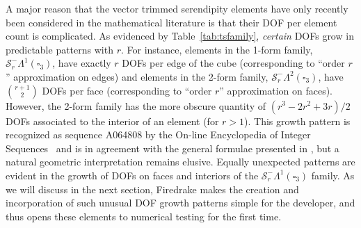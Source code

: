 \documentclass[format=acmsmall,screen,timestamp=false,a4paper]{acmart}
\DeclareMathOperator{\Div}{div}
\DeclareMathOperator{\curl}{curl}
\newcommand\akg[1]{\textbf{\textcolor[rgb]{.5,0,1}{[Andrew: #1]}}}
\newcommand{\calS}{\mathcal{S}}
\newcommand{\hcurl}{\ensuremath{{H}(\curl)}\xspace}
\newcommand{\hdiv}{\ensuremath{{H}(\Div)}\xspace}
\begin{document}
	
	A major reason that the vector trimmed serendipity elements have only recently been considered in the mathematical literature is that their DOF per element count is complicated.
	As evidenced by Table~\ref{tab:tsfamily}, \textit{certain} DOFs grow in predictable patterns with $r$.
	For instance, elements in the 1-form family, $\calS_r^-\Lambda^1(\square_3)$, have exactly $r$ DOFs per edge of the cube (corresponding to ``order $r$'' approximation on edges) and elements in the 2-form family, $\calS_r^-\Lambda^2(\square_3)$, have ${\displaystyle {r+1}\choose 2}$ DOFs per face (corresponding to ``order $r$'' approximation on faces).
	However, the 2-form family has the more obscure quantity of $(r^3 - 2r^2 + 3r)/2$ DOFs associated to the interior of an element (for $r>1$).
	This growth pattern is recognized as sequence A064808 by the On-line Encyclopedia of Integer Sequences~\cite{OEIS} and is in agreement with the general formulae presented in \citet{gillette2019trimmed}, but a natural geometric interpretation remains elusive.
	Equally unexpected patterns are evident in the growth of DOFs on faces and interiors of the $\calS_r^-\Lambda^1(\square_3)$ family.
	As we will discuss in the next section, Firedrake makes the creation and incorporation of such unusual DOF growth patterns simple for the developer, and thus opens these elements to numerical testing for the first time.
	
%	
%
%	
%  
%	
%
%
%  
%  
  
\end{document}
